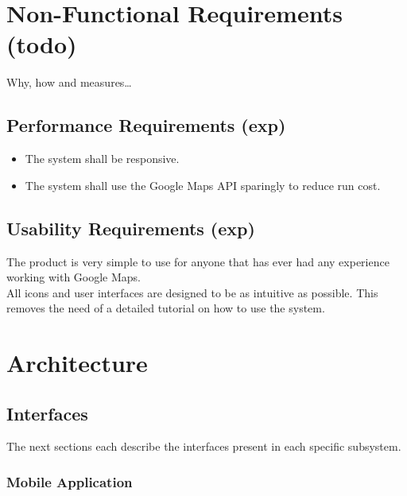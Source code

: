 \documentclass{article}
\begin{document}
    \newpage


    \section{Non-Functional Requirements (todo)}

    Why, how and measures\ldots

    \subsection{Performance Requirements (exp)}
    \begin{itemize}
        \item
            The system shall be responsive.
        \item
            The system shall use the Google Maps API sparingly to reduce run
            cost.
    \end{itemize}

    \subsection{Usability Requirements (exp)}

    The product is very simple to use for anyone that has ever had any
    experience working with Google Maps.\\ All icons and user interfaces are
    designed to be as intuitive as possible. This removes the need of a detailed
    tutorial on how to use the system.

    \newpage


    \section{Architecture}


    \subsection{Interfaces}

    The next sections each describe the interfaces present in each specific
    subsystem.

    \subsubsection{Mobile Application}
\end{document}
